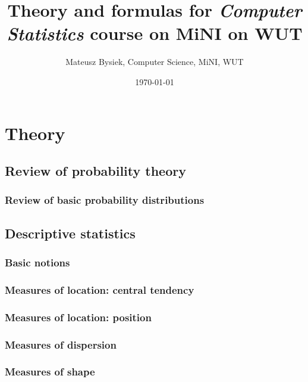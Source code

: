 \documentclass{article}
\begin{document}
\title{Theory and formulas for \emph{Computer Statistics} course on MiNI on WUT}
\date{\today}
\author{Mateusz Bysiek, Computer Science, MiNI, WUT}
\maketitle


\tableofcontents

\newpage

\section{Theory}

\subsection{Review of probability theory}

\subsubsection{Review of basic probability distributions}
\begin{multicols}{2}

\end{multicols}

\newpage

\subsection{Descriptive statistics}

\subsubsection{Basic notions}


\newpage

\begin{multicols}{2}

\subsubsection{Measures of location: central tendency}


\vfill
\columnbreak

\subsubsection{Measures of location: position}


\subsubsection{Measures of dispersion}


\subsubsection{Measures of shape}


\end{multicols}
\end{document}
